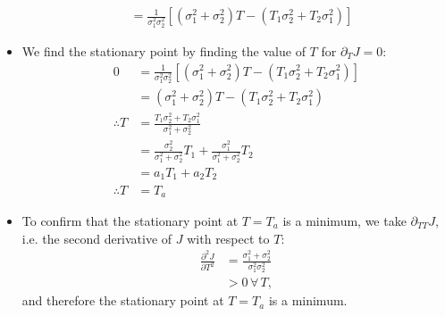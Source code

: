 \begin{itemize}
\begin{align}
        &= \frac{1}{\sigma_1^2 \sigma_2^2} \left[
            \left( \sigma_1^2 + \sigma_2^2 \right) T 
            - \left( T_1 \sigma_2^2 + T_2 \sigma_1^2 \right)
        \right]
    \end{align}
    \item We find the stationary point by finding the value of $T$ for $\partial_T J = 0$:
    \begin{align}
        0 &= \frac{1}{\sigma_1^2 \sigma_2^2} \left[
            \left( \sigma_1^2 + \sigma_2^2 \right) T 
            - \left( T_1 \sigma_2^2 + T_2 \sigma_1^2 \right)
        \right] \nonumber \\
            &= \left( \sigma_1^2 + \sigma_2^2 \right) T 
                - \left( T_1 \sigma_2^2 + T_2 \sigma_1^2 \right) \nonumber \\
        \therefore T &= \frac{T_1 \sigma_2^2 +T_2 \sigma_1^2}{\sigma_1^2 + \sigma_2^2} \nonumber \\
            &= \frac{\sigma_2^2}{\sigma_1^2 + \sigma_2^2} T_1
                + \frac{\sigma_1^2}{\sigma_1^2 + \sigma_2^2} T_2 \nonumber \\
            &= a_1 T_1 + a_2 T_2 \nonumber \\
        \therefore T &= T_a  
    \end{align}
    \item To confirm that the stationary point at $T = T_a$ is a minimum, we take $\partial_{TT} J$, i.e. the second derivative of $J$ with respect to $T$:
    \begin{align*}
        \frac{\partial^2 J}{\partial T^2} &= \frac{\sigma_1^2 + \sigma_2^2}{\sigma_1^2 \sigma_2^2} \\
            &> 0 \, \forall \, T,
    \end{align*}
    and therefore the stationary point at $T = T_a$ is a minimum.
\end{itemize}

